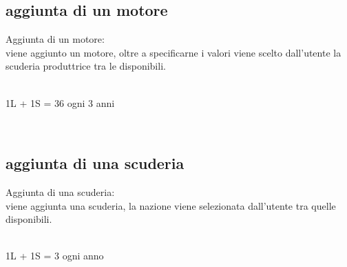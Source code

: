 \documentclass[a4paper,12pt]{report}
\begin{document}
			\subsection{aggiunta di un motore}
			Aggiunta di un motore:\\
			viene aggiunto un motore, oltre a specificarne i valori viene scelto dall'utente
			la scuderia produttrice tra le disponibili.
			\begin{table}[!htb]
				\centering
				\begin{center}
					\newline\\
					1L + 1S = 36 ogni 3 anni\\
				\end{center}
			\end{table}\\
			\subsection{aggiunta di una scuderia}
			Aggiunta di una scuderia:\\
			viene aggiunta una scuderia, la nazione viene selezionata dall'utente tra quelle disponibili.
			\begin{table}[!htb]
				\centering
				\begin{center}
				\newline\\
				1L + 1S = 3 ogni anno\\
				\end{center}
			\end{table}\\
\end{document}
